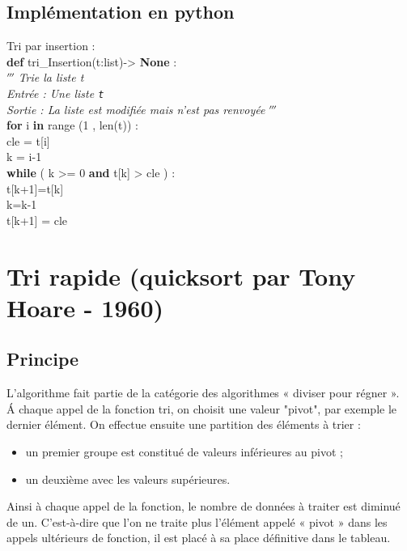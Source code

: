 \documentclass[t,11pt]{article}
\begin{document}
\vspace{-0.2cm}
\subsection{Implémentation en python}
\vspace{-0.2cm}
\begin{python}
Tri par insertion :\\
\textbf{def} tri\_Insertion(t:list)-> \textbf{None} :\\
\indente $'''$ \textit{Trie la liste t\\
\indente Entrée : Une liste \texttt{t}\\
\indente Sortie : La liste est modifiée mais n'est pas renvoyée} $'''$\\
\indente \textbf{for} i \textbf{in} range (1 , len(t)) :\\
\indente \indente cle = t[i]\\
\indente \indente k = i-1\\
\indente \indente \textbf{while} ( k >= 0 \textbf{and} t[k] > cle ) :\\
\indente \indente \indente t[k+1]=t[k]\\
\indente \indente \indente k=k-1\\
\indente \indente t[k+1] = cle

\end{python}

\section{Tri rapide (quicksort par Tony Hoare - 1960)}
\subsection{Principe}
\noindent
L'algorithme fait partie de la catégorie des algorithmes « diviser pour régner ».\\
\'A chaque appel de la fonction tri, on choisit une valeur "pivot", par exemple le dernier élément.
On effectue ensuite une partition des éléments à trier :
\begin{itemize}
\item un premier groupe est constitué de valeurs inférieures au pivot ;
\item un deuxième avec les valeurs supérieures.
\end{itemize}
Ainsi à chaque appel de la fonction, le nombre de données à traiter est diminué de un. C'est-à-dire que l'on ne traite plus l'élément appelé « pivot » dans les appels ultérieurs de fonction, il est placé à sa place définitive dans le tableau.
\end{document}
